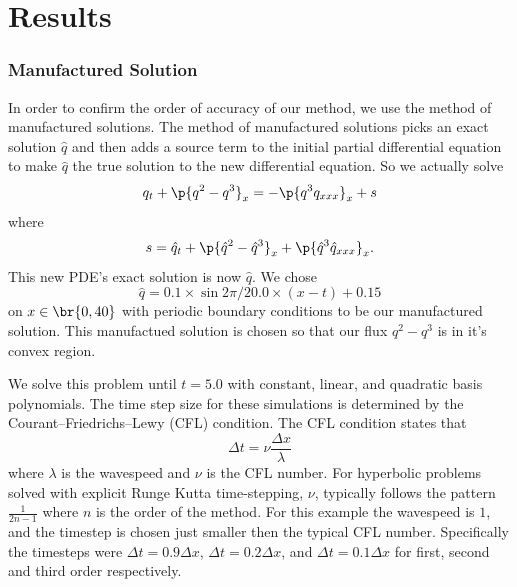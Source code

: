 \chapter{Results}
\subsection{Manufactured Solution}\label{ssec:manufactured_solution}
In order to confirm the order of accuracy of our method, we use the method of
manufactured solutions.
The method of manufactured solutions picks an exact solution \(\hat{q}\) and then adds
a source term to the initial partial differential equation to make \(\hat{q}\) the
true solution to the new differential equation.
So we actually solve
\begin{equation}
    q_t + \p{q^2 - q^3}_x = -\p{q^3 q_{xxx}}_x + s
\end{equation}
where
\begin{equation}
    s = \hat{q}_t + \p{\hat{q}^2 - \hat{q}^3}_x + \p{\hat{q}^3 \hat{q}_{xxx}}_x.\label{eq:source_term}
\end{equation}
This new PDE's exact solution is now \(\hat{q}\).
We chose
\begin{equation}
    \hat{q} = 0.1 \times \sin{2 \pi / 20.0 \times (x - t)} + 0.15\label{eq:exact_solution}
\end{equation}
on \(x \in \br{0, 40}\) with periodic boundary conditions to be our manufactured
solution.
This manufactued solution is chosen so that our flux \(q^2 - q^3\) is in it's convex
region.

We solve this problem until \(t = 5.0\) with constant, linear, and quadratic basis
polynomials.
The time step size for these simulations is determined by the
Courant–Friedrichs–Lewy (CFL) condition.
The CFL condition states that
\begin{equation}
  \Delta t = \nu \frac{\Delta x}{\lambda}
\end{equation}
where \(\lambda \) is the wavespeed and \(\nu \) is the CFL number.
For hyperbolic problems solved with explicit Runge Kutta time-stepping, \(\nu \),
typically follows the pattern \(\frac{1}{2n - 1} \) where \(n\) is the order of the
method.
For this example the wavespeed is \(1\), and the timestep is chosen just smaller
then the typical CFL number.
Specifically the timesteps were \(\Delta t = 0.9 \Delta x\),
\(\Delta t = 0.2 \Delta x\), and \(\Delta t = 0.1 \Delta x\)
for first, second and third order respectively.


